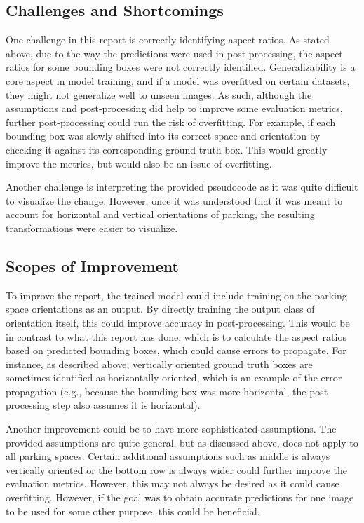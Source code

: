 \documentclass[man]{apa7}
\begin{document}
\subsection{Challenges and Shortcomings}

One challenge in this report is correctly identifying aspect ratios. As stated above, due to the way the predictions were used in post-processing, the aspect ratios for some bounding boxes were not correctly identified. Generalizability is a core aspect in model training, and if a model was overfitted on certain datasets, they might not generalize well to unseen images. As such, although the assumptions and post-processing did help to improve some evaluation metrics, further post-processing could run the risk of overfitting. For example, if each bounding box was slowly shifted into its correct space and orientation by checking it against its corresponding ground truth box. This would greatly improve the metrics, but would also be an issue of overfitting.

Another challenge is interpreting the provided pseudocode as it was quite difficult to visualize the change. However, once it was understood that it was meant to account for horizontal and vertical orientations of parking, the resulting transformations were easier to visualize. 

\subsection{Scopes of Improvement}

To improve the report, the trained model could include training on the parking space orientations as an output. By directly training the output class of orientation itself, this could improve accuracy in post-processing. This would be in contrast to what this report has done, which is to calculate the aspect ratios based on predicted bounding boxes, which could cause errors to propagate. For instance, as described above, vertically oriented ground truth boxes are sometimes identified as horizontally oriented, which is an example of the error propagation (e.g., because the bounding box was more horizontal, the post-processing step also assumes it is horizontal).

Another improvement could be to have more sophisticated assumptions. The provided assumptions are quite general, but as discussed above, does not apply to all parking spaces. Certain additional assumptions such as middle is always vertically oriented or the bottom row is always wider could further improve the evaluation metrics. However, this may not always be desired as it could cause overfitting. However, if the goal was to obtain accurate predictions for one image to be used for some other purpose, this could be beneficial.
\end{document}
